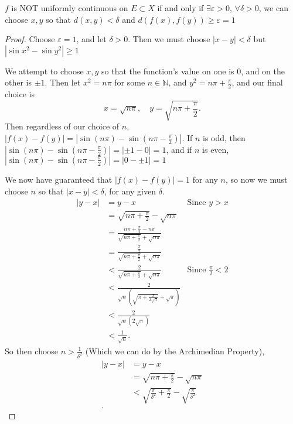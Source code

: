 \documentclass{article}
\begin{document}
\begin{enumerate}
\begin{enumerate}
            $f$ is NOT uniformly continuous on $E\subset X$ if and only if $\exists\varepsilon>0$, $\forall  \delta>0$, we can choose $x,y$ so that $d(x,y)<\delta$ and $ d(f(x),f(y))\geq\varepsilon=1$
            \begin{proof} 

                Choose $\varepsilon=1$, and let $\delta>0$. Then we must choose $|x-y|<\delta$ but 
                $|\sin x^2-\sin y^2|\ge 1$

                We attempt to choose $x,y$ so that the function's value on one is $0$, and on the other
                is $\pm 1$. Then let $x^2=n\pi$ for some $n\in \mathbb{N}$, and $y^2= n\pi+\frac{\pi}{2}$,
                and our final choice is 
                \[
                x=\sqrt{n\pi},\quad y=\sqrt{n\pi+\frac{\pi}{2}}
                .\] 
                Then regardless of our choice of $n$, $|f(x)-f(y)|
                =|\sin(n\pi)-\sin\left(n\pi-\frac{\pi}{2}\right)|$. If $n$ is odd, then 
                $|\sin(n\pi)-\sin\left(n\pi-\frac{\pi}{2}\right)|=|\pm 1 -0|=1$, and if $n$ is even,
                $|\sin(n\pi)-\sin\left(n\pi-\frac{\pi}{2}\right)|=|0 -\pm 1|=1$

                We now have guaranteed that $|f(x)-f(y)|=1$ for any $n$, so now we must choose $n$
                so that $|x-y|<\delta$, for any given $\delta$. 
                \begin{align*}
                    |y-x|&=y-x&\text{Since }y>x\\
                    &= \sqrt{n\pi+\frac{\pi}{2}} -\sqrt{n\pi} \\
                    &= \frac{n\pi+\frac{\pi}{2}-n\pi}{\sqrt{n\pi+\frac{\pi}{2}} +\sqrt{n\pi}} \\
                    &= \frac{\frac{\pi}{2}}{\sqrt{n\pi+\frac{\pi}{2}} +\sqrt{n\pi}} \\
                    &< \frac{2}{\sqrt{n\pi+\frac{\pi}{2}} +\sqrt{n\pi}} &\text{Since }\frac{\pi}{2}<2\\
                    &< \frac{2}{\sqrt{n}\left(\sqrt{\pi+\frac{\pi}{2\sqrt{n}}} +\sqrt{\pi}\right)}\\
                    &< \frac{2}{\sqrt{n}\left(2\sqrt{\pi}\right)}\\
                    &< \frac{1}{\sqrt{n}}
                .\end{align*}
                So then choose $n>\frac{1}{\delta^2}$ (Which we can do by the Archimedian Property), 
                \begin{align*}
                    |y-x|&= y-x \\
                    &= \sqrt{n\pi+\frac{\pi}{2}} -\sqrt{n\pi}  \\
                    &< \sqrt{\frac{\pi}{\delta^2}+\frac{\pi}{2}} -\sqrt{\frac{\pi}{\delta^2}} \\
                .\end{align*}


\end{proof}
\end{enumerate}
\end{enumerate}
\end{document}
